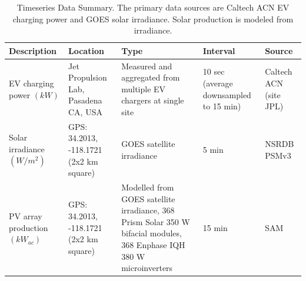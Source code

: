 \documentclass[journal,article,submit,pdftex,moreauthors]{Definitions/mdpi}
\begin{document}

\begin{table}[!h]
  \caption{Timeseries Data Summary. The primary data sources are Caltech ACN EV charging power and GOES solar irradiance. Solar production is modeled from irradiance.}
  \label{tab:data-summary}
  \begin{tabularx}{\linewidth}{XXXXX}
    \toprule
    Description                     & Location                                & Type                                                                                                                  & Interval                               & Source                                \\
    \midrule
    EV charging power $(kW)$   & Jet Propulsion Lab, Pasadena CA, USA    & Measured and aggregated from multiple  EV chargers at single site                                                     & 10 sec (average downsampled to 15 min) & Caltech ACN (site JPL) \cite{Lee2021} \\
    Solar irradiance $(W/m^2)$      & GPS: 34.2013, -118.1721 (2x2 km square) & GOES satellite irradiance                                                                                             & 5 min                                  & NSRDB PSMv3 \cite{Sengupta2018}       \\
    PV array production $(kW_{ac})$ & GPS: 34.2013, -118.1721 (2x2 km square) & Modelled from GOES satellite irradiance, 368 Prism Solar 350 W bifacial modules, 368 Enphase IQH 380 W microinverters & 15 min                                 & SAM \cite{NREL2022}                   \\
    \bottomrule
  \end{tabularx}
\end{table}
\end{document}
